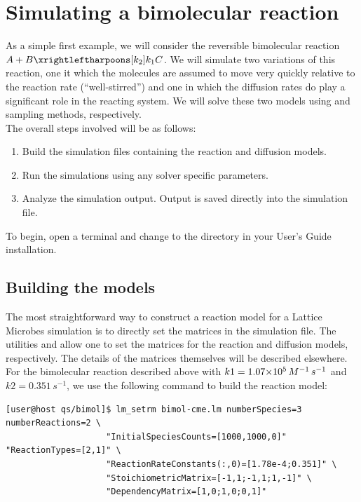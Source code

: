 \section{Simulating a bimolecular reaction}

As a simple first example, we will consider the reversible bimolecular reaction $A + B \xrightleftharpoons[k_{2}]{k_{1}} C$. We will simulate two variations of this reaction, one it which the molecules are assumed to move very quickly relative to the reaction rate (``well-stirred'') and one in which the diffusion rates do play a significant role in the reacting system. We will solve these two models using  and  sampling methods, respectively.\\

The overall steps involved will be as follows:
\begin{enumerate}
\item Build the simulation files containing the reaction and diffusion models.
\item Run the simulations using any solver specific parameters.
\item Analyze the simulation output. Output is saved directly into the simulation file.
\end{enumerate}

To begin, open a terminal and change to the  directory in your User's Guide installation.

\subsection{Building the models}

The most straightforward way to construct a reaction model for a Lattice Microbes simulation is to directly set the matrices in the simulation file. The utilities  and  allow one to set the matrices for the reaction and diffusion models, respectively. The details of the matrices themselves will be described elsewhere. For the bimolecular reaction described above with $k1=1.07{\times}10^{5}\,M^{-1}\,s^{-1}$ and $k2=0.351\,s^{-1}$, we use the following command to build the reaction model:
{\small\begin{verbatim}
[user@host qs/bimol]$ lm_setrm bimol-cme.lm numberSpecies=3 numberReactions=2 \
                    "InitialSpeciesCounts=[1000,1000,0]" "ReactionTypes=[2,1]" \
                    "ReactionRateConstants(:,0)=[1.78e-4;0.351]" \
                    "StoichiometricMatrix=[-1,1;-1,1;1,-1]" \
                    "DependencyMatrix=[1,0;1,0;0,1]"
\end{verbatim}}

